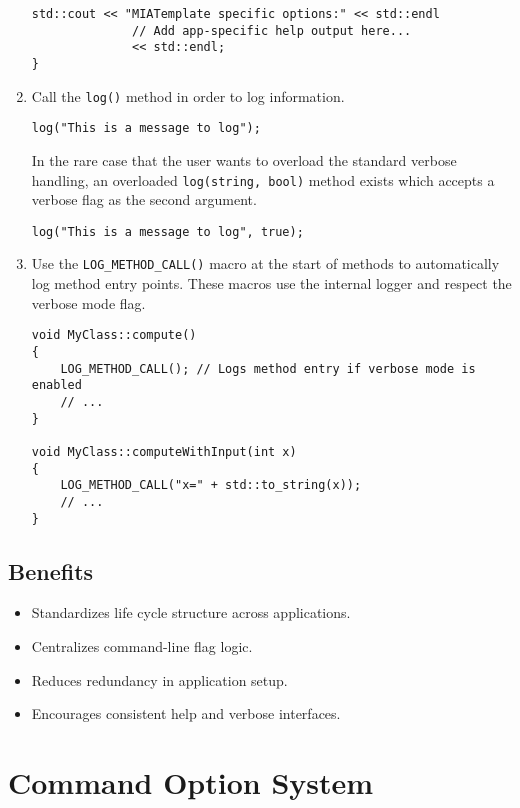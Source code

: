 \begin{enumerate}
\begin{lstlisting}[style=cppstyle]
    std::cout << "MIATemplate specific options:" << std::endl
              // Add app-specific help output here...
              << std::endl;
}
	\end{lstlisting}
 
	\item Call the \texttt{log()} method in order to log information.
	\begin{lstlisting}[style=cppstyle]
log("This is a message to log");
	\end{lstlisting}
	In the rare case that the user wants to overload the standard verbose handling, an overloaded \texttt{log(string, bool)} method exists which accepts a verbose flag as the second argument.
	\begin{lstlisting}[style=cppstyle]
log("This is a message to log", true);
	\end{lstlisting}
 
	 \item Use the \texttt{LOG\_METHOD\_CALL()} macro at the start of methods to automatically log method entry points. These macros use the internal logger and respect the verbose mode flag.
	\begin{lstlisting}[style=cppstyle]
void MyClass::compute()
{
    LOG_METHOD_CALL(); // Logs method entry if verbose mode is enabled
    // ...
}

void MyClass::computeWithInput(int x)
{
    LOG_METHOD_CALL("x=" + std::to_string(x));
    // ...
}
	\end{lstlisting}
\end{enumerate}

\subsection*{Benefits}
\begin{itemize}
	\item Standardizes life cycle structure across applications.
	\item Centralizes command-line flag logic.
	\item Reduces redundancy in application setup.
	\item Encourages consistent help and verbose interfaces.
\end{itemize}










\section{Command Option System}
\label{sec:cmd-option-system}

